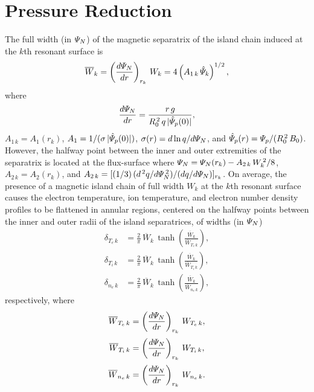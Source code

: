 \documentclass[notitlepage,12pt]{article}
\begin{document}
\section{Pressure Reduction} \label{a5}
The full width (in ${\mit\Psi}_N$)  of the magnetic separatrix of the island chain induced at the $k$th resonant surface is
\begin{equation}
\overline{W}_k = \left(\frac{d{\mit\Psi}_N}{dr}\right)_{r_k}\,W_k=4\left(A_{1\,k}\,\hat{\mit\Psi}_k\right)^{1/2},
\end{equation}
where 
\begin{equation}
\frac{d{\mit\Psi}_N}{dr} = \frac{r\,g}{R_0^{\,2}\,q\,|\hat{\mit\Psi}_p(0)|},
\end{equation}
$A_{1\,k}=A_1(r_k)$, $A_1 = 1/(\sigma\,|\hat{\mit\Psi}_p(0)|)$,  $\sigma(r) = d\ln q/d{\mit\Psi}_N$, and $\hat{\mit\Psi}_p(r) = {\mit\Psi}_p/(R_0^{\,2}\,B_0)$.  
However, the halfway point between the inner and outer extremities of the separatrix is located at the flux-surface where ${\mit\Psi}_N = {\mit\Psi}_N(r_k) - A_{2\,k}\,W_k^{\,2}/8$, $A_{2\,k}=A_2(r_k)$, and $A_{2\,k} = [(1/3)\,(d^{\,2}q/d{\mit\Psi}_N^{\,2})/(dq/d{\mit\Psi}_N)]_{r_k}$.
On average, the presence of a magnetic island chain of full width $W_k$ at the $k$th resonant surface
causes the electron temperature, ion temperature,  and electron number density profiles to be flattened in  annular regions, centered on the
halfway points between the inner and outer radii of the island separatrices, of widths (in ${\mit\Psi}_N$)
\begin{align}
\delta_{T_e\,k}& = \frac{2}{\pi}\,\overline{W}_k\,\tanh\left(\frac{\overline{W}_k}{\overline{W}_{T_e\,k}}\right),\\[0.5ex]
\delta_{T_i\,k}& = \frac{2}{\pi}\,\overline{W}_k\,\tanh\left(\frac{\overline{W}_k}{\overline{W}_{T_i\,k}}\right),\\[0.5ex]
\delta_{n_e\,k}& = \frac{2}{\pi}\,\overline{W}_k\,\tanh\left(\frac{\overline{W}_k}{\overline{W}_{n_e\,k}}\right),
\end{align}
respectively, where
\begin{align}
\overline{W}_{T_e\,k} &=  \left(\frac{d{\mit\Psi}_N}{dr}\right)_{r_k}\,W_{T_e\,k},\\[0.5ex]
\overline{W}_{T_i\,k} &= \left(\frac{d{\mit\Psi}_N}{dr}\right)_{r_k}\,W_{T_i\,k},\\[0.5ex]
\overline{W}_{n_e\,k} &= \left(\frac{d{\mit\Psi}_N}{dr}\right)_{r_k}\,W_{n_e\,k}.
\end{align}
\end{document}
